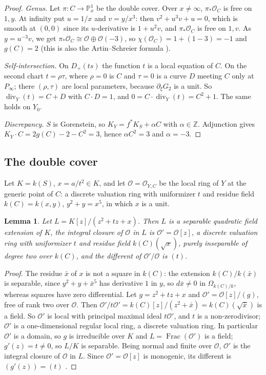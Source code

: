 \documentclass[11pt,a4paper]{article}
\newtheorem{lemma}{Lemma}[section]
\theoremstyle{definition}
\newcommand{\PP}{\mathbb{P}}
\newcommand{\Z}{\mathbb{Z}}
\newcommand{\cO}{\mathcal{O}}
\newcommand{\Frac}{\operatorname{Frac}}
\newcommand{\divi}{\operatorname{div}}
\begin{document}
\begin{proof}
\emph{Genus.} Let $\pi\colon C\to\PP^1_x$ be the double cover. Over $x\ne\infty$,
$\pi_*\cO_C$ is free on $1,y$. At infinity put $u=1/x$ and $v=y/x^3$: then
$v^2+u^3v+u=0$, which is smooth at $(0,0)$ since its $u$-derivative is
$1+u^2v$, and $\pi_*\cO_C$ is free on $1,v$. As $y=u^{-3}v$, we get
$\pi_*\cO_C\cong\cO\oplus\cO(-3)$, so $\chi(\cO_C)=1+(1-3)=-1$ and $g(C)=2$
(this is also the Artin--Schreier formula \cite[Prop.~3.7.8]{Sti}).

\emph{Self-intersection.} On $D_+(ts)$ the function $t$ is a local equation
of $C$. On the second chart $t=\rho\tau$, where $\rho=0$ is $C$ and $\tau=0$
is a curve $D$ meeting $C$ only at $P_\infty$; there $(\rho,\tau)$ are local
parameters, because $\partial_\xi G_2$ is a unit. So
$\divi_Y(t)=C+D$ with $C\cdot D=1$, and $0=C\cdot\divi_Y(t)=C^2+1$. The same
holds on $Y_0$.

\emph{Discrepancy.} $S$ is Gorenstein, so $K_Y=f^*K_S+\alpha C$ with
$\alpha\in\Z$. Adjunction gives $K_Y\cdot C=2g(C)-2-C^2=3$, hence
$\alpha C^2=3$ and $\alpha=-3$.
\end{proof}

\subsection{The double cover}

Let $K=k(S)$, $x=a/t^2\in K$, and let $\cO=\cO_{Y,C}$ be the local ring of
$Y$ at the generic point of $C$: a discrete valuation ring with uniformizer
$t$ and residue field $k(C)=k(x,y)$, $y^2+y=x^5$, in which $x$ is a unit.

\begin{lemma}\label{lem:ext}
Let $L=K[z]/(z^2+tz+x)$. Then $L$ is a separable quadratic field extension
of $K$, the integral closure of $\cO$ in $L$ is $\cO'=\cO[z]$, a discrete
valuation ring with uniformizer $t$ and residue field $k(C)(\sqrt{x})$,
purely inseparable of degree two over $k(C)$, and the different of
$\cO'/\cO$ is $(t)$.
\end{lemma}

\begin{proof}
The residue $\bar x$ of $x$ is not a square in $k(C)$: the extension
$k(C)/k(\bar x)$ is separable, since $y^2+y+\bar x^5$ has derivative $1$
in $y$, so $d\bar x\ne0$ in $\Omega_{k(C)/k}$, whereas squares have zero
differential. Let $g=z^2+tz+x$ and $\cO'=\cO[z]/(g)$, free of rank two over
$\cO$. Then $\cO'/t\cO'=k(C)[z]/(z^2+\bar x)=k(C)(\sqrt{\bar x})$ is a field.
So $\cO'$ is local with principal maximal ideal $t\cO'$, and $t$ is a
non-zerodivisor; $\cO'$ is a one-dimensional regular local ring, a discrete
valuation ring. In particular $\cO'$ is a domain, so $g$ is irreducible over
$K$ and $L=\Frac(\cO')$ is a field; $g'(z)=t\ne0$, so $L/K$ is separable.
Being normal and finite over $\cO$, $\cO'$ is the integral closure of $\cO$
in $L$. Since $\cO'=\cO[z]$ is monogenic, its different is
$(g'(z))=(t)$ \cite[III, \S6, Cor.~2]{Se}.
\end{proof}
\end{document}
